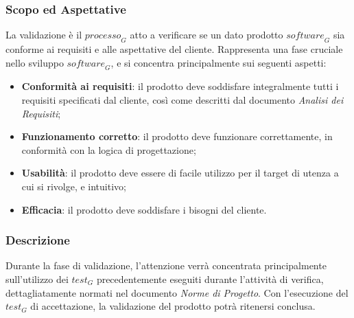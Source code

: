 \subsubsection{Scopo ed Aspettative}
La validazione è il $\textit{processo}_G$ atto a verificare se un dato prodotto $\textit{software}_G$ sia conforme ai requisiti e alle aspettative del cliente. Rappresenta una fase cruciale nello sviluppo $\textit{software}_G$, e si concentra principalmente sui seguenti aspetti:
\begin{itemize}
    \item \textbf{Conformità ai requisiti}: il prodotto deve soddisfare integralmente tutti i requisiti specificati dal
cliente, così come descritti dal documento \textit{Analisi dei Requisiti};
    \item \textbf{Funzionamento corretto}: il prodotto deve funzionare correttamente, in conformità con la logica di
progettazione;
    \item \textbf{Usabilità}: il prodotto deve essere di facile utilizzo per il target di utenza a cui si rivolge, e intuitivo;
    \item \textbf{Efficacia}: il prodotto deve soddisfare i bisogni del cliente. 
\end{itemize}

\subsubsection{Descrizione}
Durante la fase di validazione, l'attenzione verrà concentrata principalmente sull'utilizzo dei $\textit{test}_G$ precedentemente eseguiti durante l'attività di verifica, dettagliatamente normati nel documento \textit{Norme di Progetto}. Con l'esecuzione del $\textit{test}_G$ di accettazione, la validazione del prodotto potrà ritenersi conclusa.